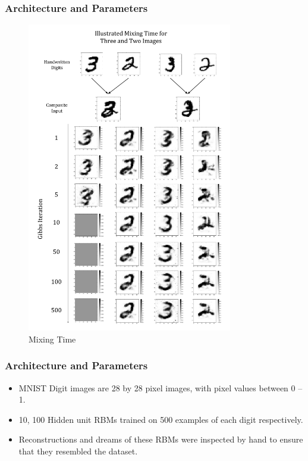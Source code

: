     \subsubsection{Architecture and Parameters}

    \begin{figure}[htb]
      \begin{center}
        \includegraphics[width=0.8\textwidth]{Assets/results/Mixing Results.png}
      \end{center}
      \caption{Mixing Time}
      \label{F:MNIST-Mixing-Time}
    \end{figure}

    \subsubsection{Architecture and Parameters}

    \begin{itemize}
      \item MNIST Digit images are 28 by 28 pixel images, with pixel values between 0 -- 1.
      \item 10, 100 Hidden unit RBMs trained on 500 examples of each digit respectively.
      \item Reconstructions and dreams of these RBMs were inspected by hand to ensure that they resembled the dataset.
    \end{itemize}

